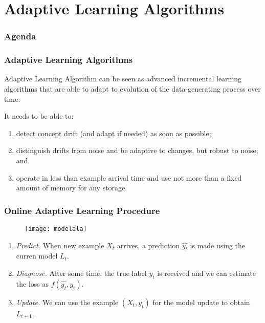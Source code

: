 \section{Adaptive Learning Algorithms}

\begin{frame}
\frametitle{Agenda}
\tableofcontents[currentsection]
\end{frame}


\begin{frame}
\frametitle{Adaptive Learning Algorithms}

\begin{de}{Adaptive Learning Algorithm}
can be seen as advanced incremental learning
algorithms that are able to adapt to evolution of the data-generating process over time.
\end{de}

It needs to be able to:
\begin{enumerate}

\item detect concept drift (and adapt if needed) as soon as possible;

\item distinguish drifts from noise and be adaptive to changes, but robust to noise; and

\item operate in less than example arrival time and use not more than a fixed amount of
memory for any storage.
\end{enumerate}


\end{frame}

\begin{frame}
\frametitle{Online Adaptive Learning Procedure}

\begin{figure}
	\texttt{[image: modelala]}
\end{figure}

\begin{enumerate}
	\item \textit{Predict.} When new example $X_t$ arrives, a prediction $\hat{y_t}$ is made using the curren model $L_t$.
	\item<2-3> \textit{Diagnose.} After some time, the true label $y_t$ is received and we can estimate the loss as $f(\hat{y_t}, y_t)$.
	\item<3> \textit{Update.} We can use the example $(X_t,y_t)$ for the model update to obtain $L_{t+1}$.
\end{enumerate}

\end{frame}


